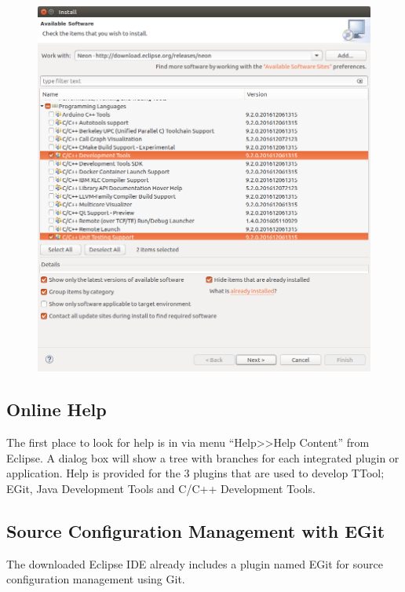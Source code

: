 \documentclass[12pt]{article}
\begin{document}
\begin{figure}[H]
\begin{center}
\includegraphics[width=\textwidth]{images/image2.png}
\caption{}
\label{fig:image2}
\end{center}
\end{figure}

\subsection{Online Help}

The first place to look for help is in via menu ``Help>>Help Content'' from
Eclipse. A dialog box will show a tree with branches for each integrated plugin
or application. Help is provided for the 3 plugins that are used to develop
TTool; EGit, Java Development Tools and C/C++ Development Tools.

\subsection{Source Configuration Management with EGit}

The downloaded Eclipse IDE already includes a plugin named EGit for source
configuration management using Git.
\end{document}
